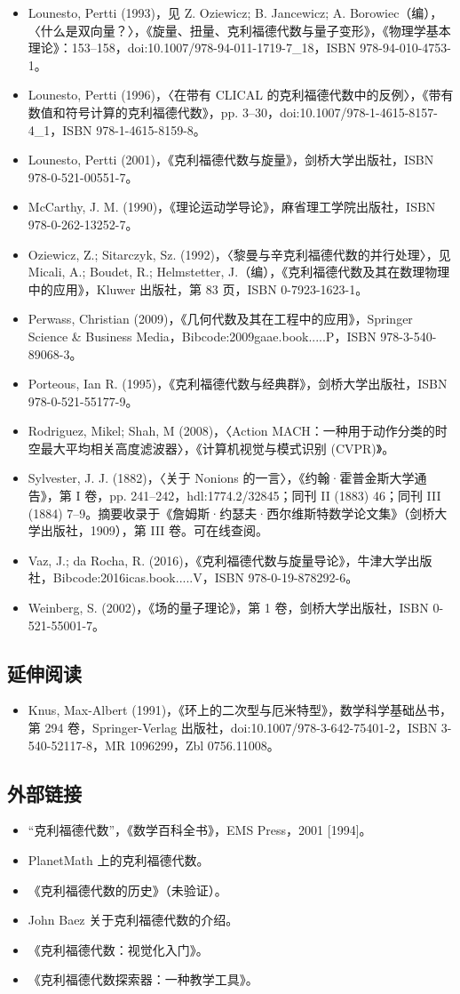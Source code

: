 \begin{itemize}
\item Lounesto, Pertti (1993)，见 Z. Oziewicz; B. Jancewicz; A. Borowiec（编），〈什么是双向量？〉，《旋量、扭量、克利福德代数与量子变形》，《物理学基本理论》：153–158，doi:10.1007/978-94-011-1719-7\_18，ISBN 978-94-010-4753-1。
\item Lounesto, Pertti (1996)，〈在带有 CLICAL 的克利福德代数中的反例〉，《带有数值和符号计算的克利福德代数》，pp. 3–30，doi:10.1007/978-1-4615-8157-4\_1，ISBN 978-1-4615-8159-8。
\item Lounesto, Pertti (2001)，《克利福德代数与旋量》，剑桥大学出版社，ISBN 978-0-521-00551-7。
\item McCarthy, J. M. (1990)，《理论运动学导论》，麻省理工学院出版社，ISBN 978-0-262-13252-7。
\item Oziewicz, Z.; Sitarczyk, Sz. (1992)，〈黎曼与辛克利福德代数的并行处理〉，见 Micali, A.; Boudet, R.; Helmstetter, J.（编），《克利福德代数及其在数理物理中的应用》，Kluwer 出版社，第 83 页，ISBN 0-7923-1623-1。
\item Perwass, Christian (2009)，《几何代数及其在工程中的应用》，Springer Science & Business Media，Bibcode:2009gaae.book.....P，ISBN 978-3-540-89068-3。
\item Porteous, Ian R. (1995)，《克利福德代数与经典群》，剑桥大学出版社，ISBN 978-0-521-55177-9。
\item Rodriguez, Mikel; Shah, M (2008)，〈Action MACH：一种用于动作分类的时空最大平均相关高度滤波器〉，《计算机视觉与模式识别 (CVPR)》。
\item Sylvester, J. J. (1882)，〈关于 Nonions 的一言〉，《约翰·霍普金斯大学通告》，第 I 卷，pp. 241–242，hdl:1774.2/32845；同刊 II (1883) 46；同刊 III (1884) 7–9。摘要收录于《詹姆斯·约瑟夫·西尔维斯特数学论文集》（剑桥大学出版社，1909），第 III 卷。可在线查阅。
\item Vaz, J.; da Rocha, R. (2016)，《克利福德代数与旋量导论》，牛津大学出版社，Bibcode:2016icas.book.....V，ISBN 978-0-19-878292-6。
\item Weinberg, S. (2002)，《场的量子理论》，第 1 卷，剑桥大学出版社，ISBN 0-521-55001-7。
\end{itemize}
\subsection{延伸阅读}
\begin{itemize}
\item Knus, Max-Albert (1991)，《环上的二次型与厄米特型》，数学科学基础丛书，第 294 卷，Springer-Verlag 出版社，doi:10.1007/978-3-642-75401-2，ISBN 3-540-52117-8，MR 1096299，Zbl 0756.11008。
\end{itemize}
\subsection{外部链接}
\begin{itemize}
\item “克利福德代数”，《数学百科全书》，EMS Press，2001 [1994]。
\item PlanetMath 上的克利福德代数。
\item 《克利福德代数的历史》（未验证）。
\item John Baez 关于克利福德代数的介绍。
\item 《克利福德代数：视觉化入门》。
\item 《克利福德代数探索器：一种教学工具》。
\end{itemize}
